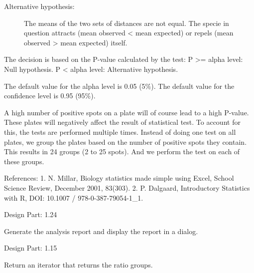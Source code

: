 \documentclass[letterpaper,10pt,english]{sphinxmanual}
\begin{document}
\begin{fulllineitems}
\begin{fulllineitems}
\begin{description}
\item[{Alternative hypothesis:}] \leavevmode
The means of the two sets of distances
are not equal. The specie in question attracts (mean
observed \textless{} mean expected) or repels (mean observed \textgreater{}
mean expected) itself.

\end{description}

The decision is based on the P-value calculated by the test:
P \textgreater{}= alpha level: Null hypothesis.
P \textless{} alpha level: Alternative hypothesis.

The default value for the alpha level is 0.05 (5\%).
The default value for the confidence level is 0.95 (95\%).

A high number of positive spots on a plate will of course lead
to a high P-value. These plates will negatively affect the
result of statistical test. To account for this, the tests
are performed multiple times. Instead of doing one test on all
plates, we group the plates based on the number of positive spots
they contain. This results in 24 groups (2 to 25 spots). And we
perform the test on each of these groups.

References:
1. N. Millar, Biology statistics made simple using Excel, School Science Review, December 2001, 83(303).
2. P. Dalgaard, Introductory Statistics with R, DOI: 10.1007 / 978-0-387-79054-1\_1.

Design Part: 1.24

\end{fulllineitems}


\begin{fulllineitems}
\label{setlyze/analysis/attraction_inter:setlyze.analysis.attraction_inter.Start.generate_report}
Generate the analysis report and display the report in a dialog.

Design Part: 1.15

\end{fulllineitems}


\begin{fulllineitems}
\label{setlyze/analysis/attraction_inter:setlyze.analysis.attraction_inter.Start.generate_spot_ratio_groups}
Return an iterator that returns the ratio groups.


\end{fulllineitems}
\end{fulllineitems}
\end{document}

